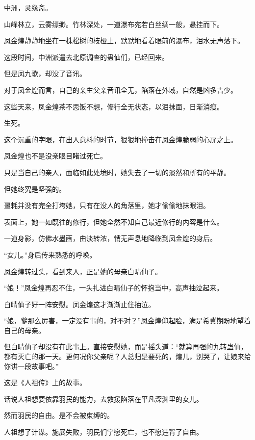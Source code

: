 
\begin{this_body}



中洲，灵缘斋。

山峰林立，云雾缥缈。竹林深处，一道瀑布宛若白丝绸一般，悬挂而下。

凤金煌静静地坐在一株松树的枝桠上，默默地看着眼前的瀑布，泪水无声落下。

这段时间，中洲派遣去北原调查的蛊仙们，已经回来。

但是凤九歌，却没了音讯。

对于凤金煌而言，自己的亲生父亲音讯全无，陷落在外域，自然是凶多吉少。

这些天来，凤金煌茶不思饭不想，修行全无状态，以泪抹面，日渐消瘦。

生死。

这个沉重的字眼，在出人意料的时节，狠狠地撞击在凤金煌脆弱的心扉之上。

凤金煌也不是没亲眼目睹过死亡。

只是当自己的亲人，面临如此处境时，她失去了一切的淡然和所有的平静。

但她终究是坚强的。

噩耗并没有完全打垮她，只有在没人的角落里，她才偷偷地抹眼泪。

表面上，她一如既往的修行，但她全然不知自己最近修行的内容是什么。

一道身影，仿佛水墨画，由淡转浓，悄无声息地降临到凤金煌的身后。

“女儿。”身后传来熟悉的呼唤。

凤金煌转过头，看到来人，正是她的母亲白晴仙子。

“娘！”凤金煌再忍不住，一头扎进白晴仙子的怀抱当中，高声抽泣起来。

白晴仙子好一阵安慰。凤金煌这才渐渐止住抽泣。

“娘，爹那么厉害，一定没有事的，对不对？”凤金煌仰起脸，满是希冀期盼地望着自己的母亲。

但白晴仙子却没有在此事上。直接安慰她，而是摇头道：“就算再强的九转蛊仙，都有灭亡的那一天。更何况你父亲呢？人总归是要死的，煌儿，别哭了，让娘来给你讲一段故事吧。”

这是《人祖传》上的故事。

话说人祖想要依靠羽民的能力，去救援陷落在平凡深渊里的女儿。

然而羽民的自由。是不会被束缚的。

人祖想了计谋。施展失败，羽民们宁愿死亡，也不愿违背了自由。


\end{this_body}

